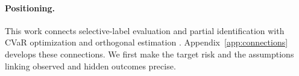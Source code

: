 \paragraph{Positioning.}
This work connects selective-label evaluation \citep{chen2025selective,coston2021fairness,lakkaraju2017selective} and partial identification \citep{manski1989anatomy,manski2003partial,scharfstein1999adjusting,tan2006distributional,zhao2019sensitivity} with CVaR optimization \citep{delage2010distributionally,duchi2021uniform,rockafellar2002conditional} and orthogonal estimation \citep{chernozhukov2018double,kallus2024localized,robins1994estimation}. Appendix~\ref{app:connections} develops these connections. We first make the target risk and the assumptions linking observed and hidden outcomes precise.
